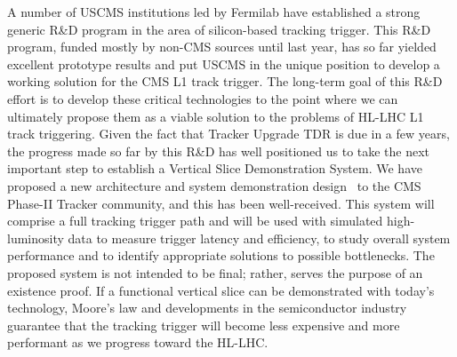 A number of USCMS institutions led by Fermilab have established a strong generic R\&D program in the area of silicon-based tracking trigger. This R\&D program, funded mostly by non-CMS sources until last year, has so far yielded excellent prototype results and put USCMS in the unique position to develop a working solution for the CMS L1 track trigger. The long-term goal of this R\&D effort is to develop these critical technologies to the point where we can ultimately propose them as a viable solution to the problems of HL-LHC L1 track triggering. Given the fact that Tracker Upgrade TDR is due in a few years,
the progress made so far by this R\&D has well positioned us to take the next important step to establish a Vertical Slice Demonstration System. We have proposed a new architecture and system demonstration design~\cite{bib:CMS_TT_Demo} to the CMS Phase-II Tracker community, and this has been well-received. This system will comprise a full tracking trigger path and will be used with simulated high-luminosity data to measure trigger latency and efficiency, to study overall system performance and to identify appropriate solutions to possible bottlenecks. The proposed system is not intended to be final; rather, serves the purpose of an existence proof. If a functional vertical slice can be demonstrated with today's technology, Moore's law and developments in the semiconductor industry guarantee that the tracking trigger will become less expensive and more performant as we progress toward the HL-LHC.

